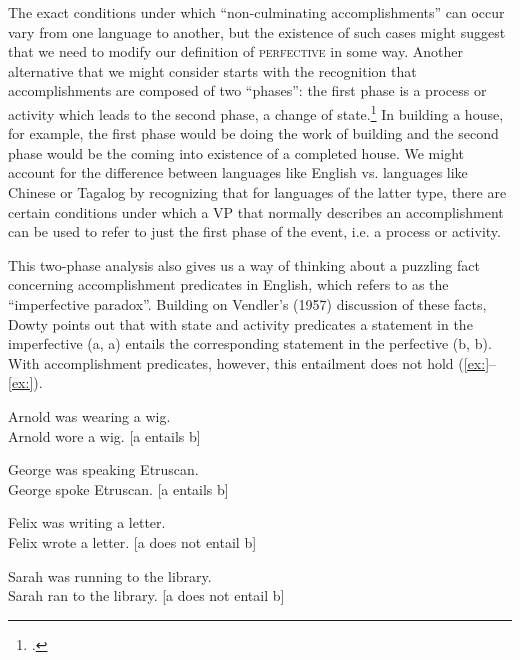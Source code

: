 The exact conditions under which “non-culminating accomplishments” can occur vary from one language to another, but the existence of such cases might suggest that we need to modify our definition of \textsc{perfective} in some way. Another alternative that we might consider starts with the recognition that accomplishments are composed of two “phases”: the first phase is a process or activity which leads to the second phase, a change of state.\footnote{\citet{KleinEtAl2000}.} In building a house, for example, the first phase would be doing the work of building and the second phase would be the coming into existence of a completed house. We might account for the difference between languages like English vs. languages like Chinese or Tagalog by recognizing that for languages of the latter type, there are certain conditions under which a VP that normally describes an accomplishment can be used to refer to just the first phase of the event, i.e. a process or activity.



This two-phase analysis also gives us a way of thinking about a puzzling fact concerning accomplishment predicates in English, which \citet{Dowty1979} refers to as the “imperfective paradox”. Building on Vendler’s (1957) discussion of these facts, Dowty points out that with state and activity predicates a statement in the imperfective (a, a) entails the corresponding statement in the perfective (b, b). With accomplishment predicates, however, this entailment does not hold (\ref{ex:}--\ref{ex:}).


\ea
\ea Arnold was wearing a wig.\\
\ex Arnold wore a wig.  [a entails b]
                       \z
\z

\ea
\ea George was speaking Etruscan.\\
\ex George spoke Etruscan.  [a entails b]
                       \z
\z

\ea
\ea Felix was writing a letter.\\
\ex Felix wrote a letter.  [a does not entail b]
                       \z
\z

\ea
\ea Sarah was running to the library.\\
\ex Sarah ran to the library.  [a does not entail b]
                       \z
\z


